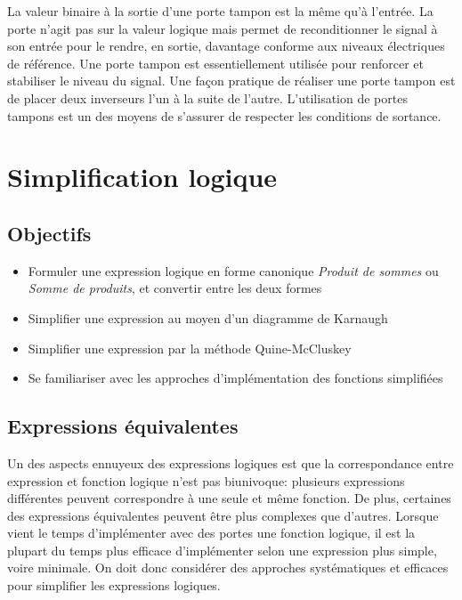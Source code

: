 \documentclass[11pt]{article}
\begin{document}
La valeur binaire à la sortie d'une porte tampon est la même qu'à
l'entrée. La porte n'agit pas sur la valeur logique mais permet de
reconditionner le signal à son entrée pour le rendre, en sortie,
davantage conforme aux niveaux électriques de référence. Une porte
tampon est essentiellement utilisée pour renforcer et stabiliser le
niveau du signal. Une façon pratique de réaliser une porte tampon est
de placer deux inverseurs l'un à la suite de l'autre. L'utilisation de
portes tampons est un des moyens de s'assurer de respecter les
conditions de sortance.


\section{Simplification logique}
\label{sec:org0d0f535}


\subsection{Objectifs}
\label{sec:org4814836}
\begin{itemize}
\item Formuler une expression logique en forme canonique \emph{Produit
de sommes} ou \emph{Somme de produits}, et convertir entre les deux formes
\item Simplifier une expression au moyen d'un diagramme de
Karnaugh
\item Simplifier une expression par la méthode Quine-McCluskey
\item Se familiariser avec les approches d'implémentation des fonctions
simplifiées
\end{itemize}


\subsection{Expressions équivalentes}
\label{sec:org1d6e631}

Un des aspects ennuyeux des expressions logiques est que la
correspondance entre expression et fonction logique n'est pas
biunivoque: plusieurs expressions différentes peuvent correspondre à
une seule et même fonction. De plus, certaines des expressions
équivalentes peuvent être plus complexes que d'autres. Lorsque vient
le temps d'implémenter avec des portes une fonction logique, il est la
plupart du temps plus efficace d'implémenter selon une expression plus
simple, voire minimale. On doit donc considérer des approches
systématiques et efficaces pour simplifier les expressions logiques.
\end{document}
